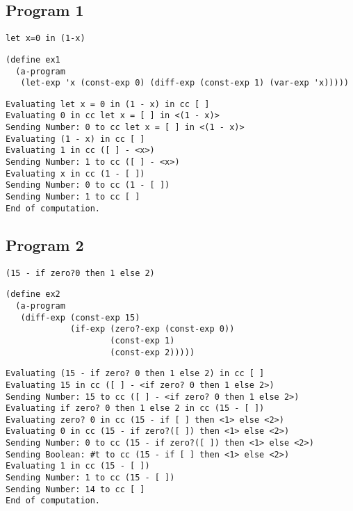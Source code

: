 \documentclass[../main.tex]{subfiles}
\begin{document}
\subsection{Program 1}

\begin{lstlisting}
let x=0 in (1-x)
\end{lstlisting}

\begin{lstlisting}
(define ex1
  (a-program
   (let-exp 'x (const-exp 0) (diff-exp (const-exp 1) (var-exp 'x)))))
\end{lstlisting}

\begin{lstlisting}
Evaluating let x = 0 in (1 - x) in cc [ ]
Evaluating 0 in cc let x = [ ] in <(1 - x)>
Sending Number: 0 to cc let x = [ ] in <(1 - x)>
Evaluating (1 - x) in cc [ ]
Evaluating 1 in cc ([ ] - <x>)
Sending Number: 1 to cc ([ ] - <x>)
Evaluating x in cc (1 - [ ])
Sending Number: 0 to cc (1 - [ ])
Sending Number: 1 to cc [ ]
End of computation.
\end{lstlisting}

\subsection{Program 2}

\begin{lstlisting}
(15 - if zero?0 then 1 else 2)
\end{lstlisting}

\begin{lstlisting}
(define ex2
  (a-program
   (diff-exp (const-exp 15)
             (if-exp (zero?-exp (const-exp 0))
                     (const-exp 1)
                     (const-exp 2)))))
\end{lstlisting}

\begin{lstlisting}
Evaluating (15 - if zero? 0 then 1 else 2) in cc [ ]
Evaluating 15 in cc ([ ] - <if zero? 0 then 1 else 2>)
Sending Number: 15 to cc ([ ] - <if zero? 0 then 1 else 2>)
Evaluating if zero? 0 then 1 else 2 in cc (15 - [ ])
Evaluating zero? 0 in cc (15 - if [ ] then <1> else <2>)
Evaluating 0 in cc (15 - if zero?([ ]) then <1> else <2>)
Sending Number: 0 to cc (15 - if zero?([ ]) then <1> else <2>)
Sending Boolean: #t to cc (15 - if [ ] then <1> else <2>)
Evaluating 1 in cc (15 - [ ])
Sending Number: 1 to cc (15 - [ ])
Sending Number: 14 to cc [ ]
End of computation.
\end{lstlisting}
\end{document}
